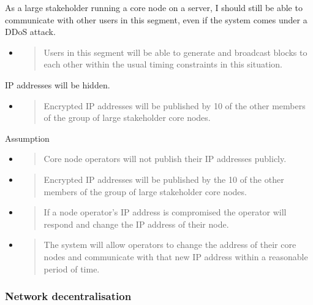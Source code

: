 \documentclass[11pt,a4paper]{article}
\begin{document}
As a large stakeholder running a core node on a server, I should still
be able to communicate with other users in this segment, even if the
system comes under a DDoS attack.

\begin{itemize}
\item
  \begin{quote}
  Users in this segment will be able to generate and broadcast blocks to
  each other within the usual timing constraints in this situation.
  \end{quote}
\end{itemize}

IP addresses will be hidden.

\begin{itemize}
\item
  \begin{quote}
  Encrypted IP addresses will be published by 10 of the other members of
  the group of large stakeholder core nodes.
  \end{quote}
\end{itemize}

Assumption

\begin{itemize}
\item
  \begin{quote}
  Core node operators will not publish their IP addresses publicly.
  \end{quote}
\item
  \begin{quote}
  Encrypted IP addresses will be published by the 10 of the other
  members of the group of large stakeholder core nodes.
  \end{quote}
\item
  \begin{quote}
  If a node operator's IP address is compromised the operator will
  respond and change the IP address of their node.
  \end{quote}
\item
  \begin{quote}
  The system will allow operators to change the address of their core
  nodes and communicate with that new IP address within a reasonable
  period of time.
  \end{quote}
\end{itemize}

\subsubsection{Network decentralisation}
\label{network-decentralisation}
\end{document}
